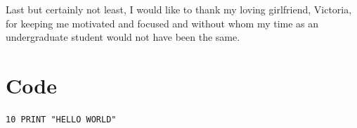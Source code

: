 \documentclass[a4paper,11pt]{report}
\begin{document}
Last but certainly not least, I would like to thank my loving girlfriend, Victoria, for keeping me motivated and focused and without whom my time as an undergraduate student would not have been the same.


\newpage
{}
\tableofcontents


\newpage
{}


% 
















\clearpage
{}
{}



\appendix


\chapter{Code}
\label{app:code}

\begin{verbatim}
10 PRINT "HELLO WORLD"
\end{verbatim}


\end{document}
